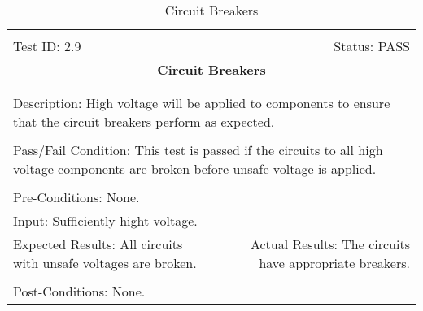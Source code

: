 \documentclass[titlepage]{article}
\begin{document}
\begin{center}
\begin{table}[h!]
\begin{tabular}{|l r|}\hline&\\[-2mm]
	Test ID: 2.9	&Status: PASS\\[-3mm]
	\multicolumn{2}{|c|}{\textbf{\large{Circuit Breakers}}}\\&\\\hline&\\[-3mm]
	\multicolumn{2}{|p{\textwidth}|}{Description: High voltage will be applied to components to ensure that the circuit breakers perform as expected.}\\[1mm]\hline&\\[-3mm]
	\multicolumn{2}{|p{\textwidth}|}{Pass/Fail Condition: This test is passed if the circuits to all high voltage components are broken before unsafe voltage is applied.}\\[1mm]\hline&\\[-3mm]
	\multicolumn{2}{|p{\textwidth}|}{Pre-Conditions: None.}\\[4mm]
	\multicolumn{2}{|p{\textwidth}|}{Input: Sufficiently hight voltage.}\\[2mm]\hline
	\multicolumn{1}{|p{0.49\textwidth}}{Expected Results: All circuits with unsafe voltages are broken.}	&\multicolumn{1}{|p{0.45\textwidth}|}{Actual Results: The circuits have appropriate breakers.}\\\hline&\\[-3mm]
	\multicolumn{2}{|p{\textwidth}|}{Post-Conditions: None.}\\\hline
\end{tabular}
\caption{Circuit Breakers}
\end{table}
\end{center}
\end{document}
